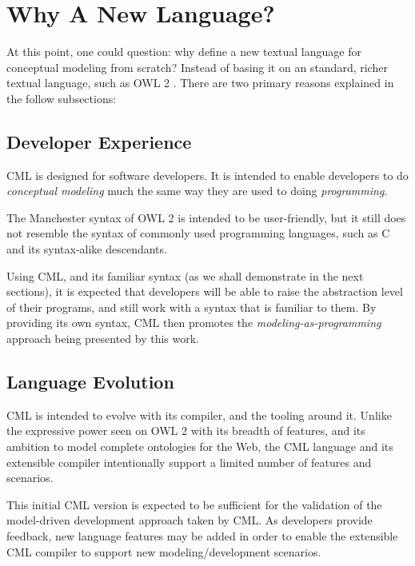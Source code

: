 \section{Why A New Language?}\label{sec:why}

At this point, one could question: why define a new textual language for conceptual modeling from scratch? Instead of basing it on an standard, richer textual language, such as OWL 2 \cite{owl2}. There are two primary reasons explained in the follow subsections:

\subsection{Developer Experience}

CML is designed for software developers.
It is intended to enable developers to do \emph{conceptual modeling} much the same way they are used to doing \emph{programming}.

The Manchester \cite{owl2manchester} syntax of OWL 2 is intended to be user-friendly,
but it still does not resemble the syntax of commonly used programming languages,
such as C \cite{clang} and its syntax-alike descendants.

Using CML,
and its familiar syntax (as we shall demonstrate in the next sections),
it is expected that developers will be able to raise the abstraction level of their programs,
and still work with a syntax that is familiar to them.
By providing its own syntax,
CML then promotes the \emph{modeling-as-programming} approach being presented by this work. 

\subsection{Language Evolution}

CML is intended to evolve with its compiler, and the tooling around it.
Unlike the expressive power seen on OWL 2 \cite{owl2} with its breadth of features,
and its ambition to model complete ontologies for the Web,
the CML language and its extensible compiler intentionally support a limited number of features and scenarios.

This initial CML version is expected to be sufficient for the validation of the model-driven development approach taken by CML.
As developers provide feedback,
new language features may be added in order to enable the extensible CML compiler to support new modeling/development scenarios.


